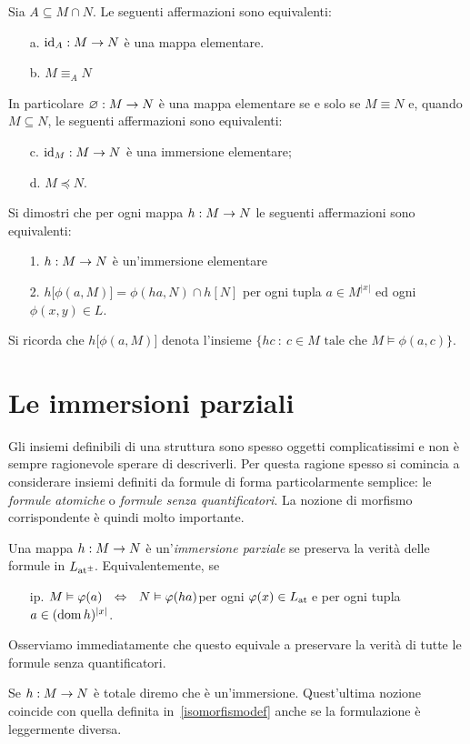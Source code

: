 \begin{remark}\label{mapelvseqelfatto}
Sia $A\subseteq M\cap N$. Le seguenti affermazioni sono equivalenti:
\begin{itemize}
\item[a.] $\textrm{id}_A:M\rightarrow N$ \`e una mappa elementare.
\item[b.] $M\equiv_A N$
\end{itemize}
In particolare $\varnothing:M\rightarrow N$ \`e una mappa elementare se e solo se $M\equiv N$ e, quando $M\subseteq N$, le seguenti affermazioni sono equivalenti:
\begin{itemize}
\item[c.] $\textrm{id}_M:M\rightarrow N$ \`e una immersione elementare;
\item[d.] $M\preceq N$.\QED
\end{itemize}
\end{remark}

\begin{exercise}
Si dimostri che per ogni mappa  $h:M\rightarrow N$ le seguenti affermazioni sono equivalenti:
\begin{itemize}
\item[1.] $h:M\rightarrow N$ \`e un'immersione elementare 
\item[2.] $h\big[\phi(a,M)\big]=\phi(ha,N)\cap h[N]$ per ogni tupla $a\in M^{|x|}$ ed ogni $\phi(x,y)\in L$.
\end{itemize}
Si ricorda che $h\big[\phi(a,M)\big]$ denota l'insieme $\big\{hc\ :\ c\in M\textrm{ tale che }M\models\phi(a,c)\big\}$.
\end{exercise}


\section{Le immersioni parziali}
\label{paragrafoimmersioni}

Gli insiemi definibili di una struttura sono spesso oggetti complicatissimi e non \`e sempre ragionevole sperare di descriverli. Per questa ragione spesso si comincia a considerare insiemi definiti da formule di forma particolarmente semplice: le \emph{formule atomiche} o \emph{formule senza quantificatori}. La nozione di morfismo corrispondente \`e  quindi molto importante.

\begin{definition}\label{defperservaverita}
Una mappa $h:M\rightarrow N$ \`e un'\emph{immersione parziale\/} se preserva la verit\`a delle formule in $L_{{\tiny\rm at^\pm}}\hskip-.3ex$. Equivalentemente, se 
\begin{itemize}
\item[ip.] $M\models\phi(a)\ \ \IFF\ \ N\models\phi(ha)$\hfill per ogni $\varphi(x)\in L_{\tiny\rm at}\hskip-.3ex$ e per ogni tupla $a\in (\mathop{\rm dom} h)^{|x|}$.
\end{itemize}
Osserviamo immediatamente che questo equivale a preservare la verit\`a di tutte le formule senza quantificatori. 

Se  $h:M\rightarrow N$ \`e totale diremo che \`e un'immersione. Quest'ultima nozione coincide con quella definita in~\ref{isomorfismodef} anche se la formulazione \`e leggermente diversa.\QED
\end{definition}

